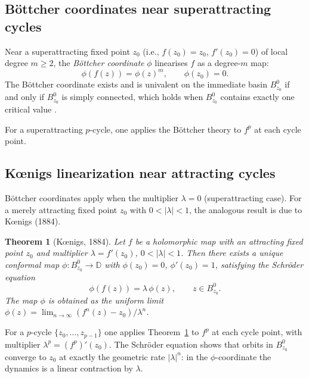 \documentclass[12pt]{article}
\newtheorem{theorem}{Theorem}[section]
\theoremstyle{definition}
\begin{document}
\subsection{B\"ottcher coordinates near superattracting cycles}

Near a superattracting fixed point $z_0$ (i.e., $f(z_0)=z_0$,
$f'(z_0)=0$) of local degree $m\geq 2$, the \emph{B\"ottcher coordinate}
$\phi$ linearises $f$ as a degree-$m$ map:
\begin{equation}\label{eq:bottcher}
  \phi(f(z)) = \phi(z)^m, \qquad \phi(z_0)=0.
\end{equation}
The B\"ottcher coordinate exists and is univalent on the immediate basin
$B^0_{z_0}$ if and only if $B^0_{z_0}$ is simply connected, which holds
when $B^0_{z_0}$ contains exactly one critical value \cite{Milnor2006}.

For a superattracting $p$-cycle, one applies the B\"ottcher theory to
$f^p$ at each cycle point.

\subsection{K\oe nigs linearization near attracting cycles}
\label{subsec:koenigs}

Böttcher coordinates apply when the multiplier $\lambda=0$ (superattracting
case).  For a merely attracting fixed point $z_0$ with $0<|\lambda|<1$, the
analogous result is due to Kœnigs (1884).

\begin{theorem}[K\oe nigs, 1884]\label{thm:koenigs}
Let $f$ be a holomorphic map with an attracting fixed point $z_0$ and
multiplier $\lambda=f'(z_0)$, $0<|\lambda|<1$.  Then there exists a
unique conformal map $\phi\colon B^0_{z_0}\to\mathbb{D}$ with $\phi(z_0)=0$,
$\phi'(z_0)=1$, satisfying the Schröder equation
\begin{equation}\label{eq:koenigs}
  \phi(f(z)) = \lambda\,\phi(z), \qquad z\in B^0_{z_0}.
\end{equation}
The map $\phi$ is obtained as the uniform limit
$\phi(z) = \lim_{n\to\infty} (f^n(z)-z_0)/\lambda^n$.
\end{theorem}

For a $p$-cycle $\{z_0,\ldots,z_{p-1}\}$ one applies Theorem~\ref{thm:koenigs}
to $f^p$ at each cycle point, with multiplier $\lambda^p=(f^p)'(z_0)$.
The Schröder equation shows that orbits in $B^0_{z_0}$ converge to $z_0$ at
exactly the geometric rate $|\lambda|^n$: in the $\phi$-coordinate the
dynamics is a linear contraction by $\lambda$.
\end{document}
